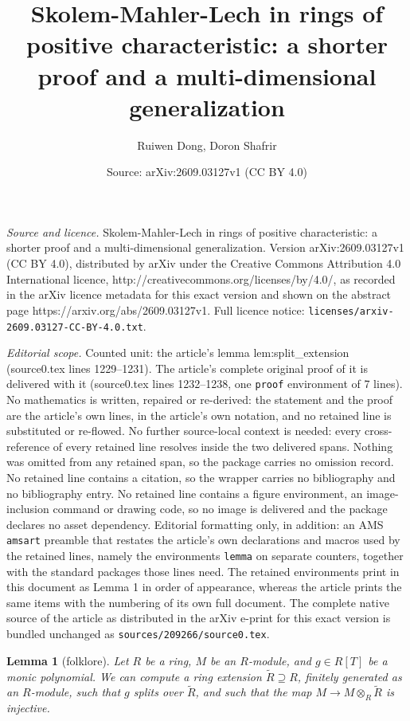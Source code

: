 \documentclass[10pt,a4paper]{amsart}
\title{Skolem-Mahler-Lech in rings of positive characteristic: a shorter proof and a multi-dimensional generalization}
\author{Ruiwen Dong, Doron Shafrir}
\date{Source: arXiv:2609.03127v1 (CC BY 4.0)}
\newtheorem{lemma}{Lemma}
\begin{document}
\maketitle

\noindent\emph{Source and licence.} Skolem-Mahler-Lech in rings of positive characteristic: a shorter proof and a multi-dimensional generalization. Version arXiv:2609.03127v1 (CC BY 4.0), distributed by arXiv under the Creative Commons Attribution 4.0 International licence, http://creativecommons.org/licenses/by/4.0/, as recorded in the arXiv licence metadata for this exact version and shown on the abstract page https://arxiv.org/abs/2609.03127v1. Full licence notice: \texttt{licenses/arxiv-2609.03127-CC-BY-4.0.txt}.\par\smallskip

\noindent\textit{Editorial scope.} Counted unit: the article's lemma lem:split\_extension (source0.tex lines 1229--1231). The article's complete original proof of it is delivered with it (source0.tex lines 1232--1238, one \texttt{proof} environment of 7 lines). No mathematics is written, repaired or re-derived: the statement and the proof are the article's own lines, in the article's own notation, and no retained line is substituted or re-flowed.  No further source-local context is needed: every cross-reference of every retained line resolves inside the two delivered spans.  Nothing was omitted from any retained span, so the package carries no omission record.  No retained line contains a citation, so the wrapper carries no bibliography and no bibliography entry.  No retained line contains a figure environment, an image-inclusion command or drawing code, so no image is delivered and the package declares no asset dependency.  Editorial formatting only, in addition: an AMS \texttt{amsart} preamble that restates the article's own declarations and macros used by the retained lines, namely the environments \texttt{lemma} on separate counters, together with the standard packages those lines need.  The retained environments print in this document as Lemma 1 in order of appearance, whereas the article prints the same items with the numbering of its own full document.  The complete native source of the article as distributed in the arXiv e-print for this exact version is bundled unchanged as \texttt{sources/209266/source0.tex}.
\begin{lemma}[folklore]\label{lem:split_extension}
    Let $R$ be a ring, $M$ be an $R$-module, and $g \in R[T]$ be a monic polynomial. We can compute a ring extension $\widetilde R \supseteq R$, finitely generated as an $R$-module, such that $g$ splits over $\widetilde R$, and such that the map $M\rightarrow M\otimes _R \widetilde R$ is injective. 
\end{lemma}
\end{document}
